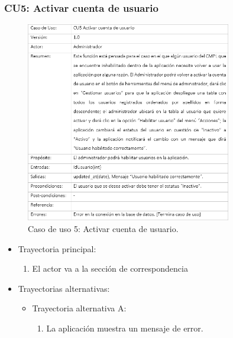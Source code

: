 		\subsubsection{CU5: Activar cuenta de usuario}
			\begin{figure}[htbp!]
				\centering
					\includegraphics[width=0.8\textwidth]{images/CU/CU5}
					\caption{Caso de uso 5: Activar cuenta de usuario.}
				\label{Tabla}
			\end{figure}
			
			\begin{itemize}
				\item Trayectoria principal:
					\begin{enumerate}
						\item El actor va a la sección de correspondencia 
					\end{enumerate}
				\item Trayectorias alternativas:
					\begin{itemize}
						\item Trayectoria alternativa A:
							\begin{enumerate}
								\item La aplicación muestra un mensaje de error.
							\end{enumerate}
					\end{itemize}
			\end{itemize}
			
